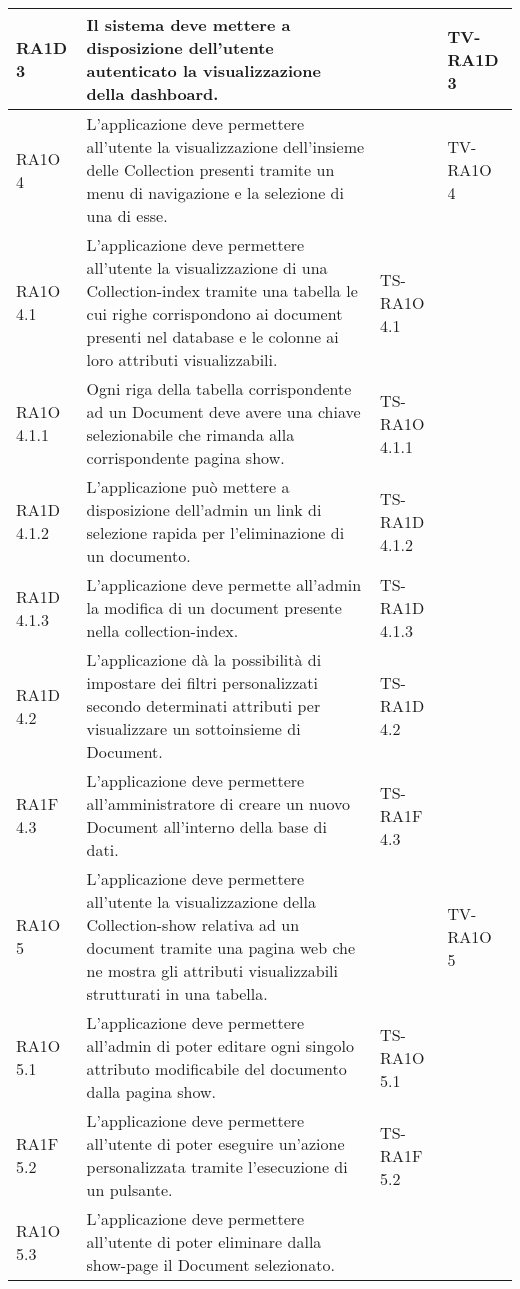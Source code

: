 \begin{center}
\begin{longtable}{| p{2cm} | p{6cm} | p{2.5cm} | p{2.5cm} | }
				RA1D 3 & 
				Il sistema deve mettere a disposizione dell'utente autenticato la visualizzazione della dashboard. &  & TV-RA1D 3 \\ \hline 
				RA1O 4 & 
				L'applicazione deve permettere all'utente la visualizzazione dell'insieme delle Collection presenti tramite un menu di navigazione e la selezione di una di esse. &  & TV-RA1O 4 \\ \hline 
				RA1O 4.1 & 
				L'applicazione deve permettere all'utente la visualizzazione di una Collection-index tramite una tabella le cui righe corrispondono ai document presenti nel database e le colonne ai loro attributi visualizzabili. & TS-RA1O 4.1 & \\ \hline 
				RA1O 4.1.1 & 
				Ogni riga della tabella corrispondente ad un Document deve avere una chiave selezionabile che rimanda alla corrispondente pagina show. & TS-RA1O 4.1.1 & \\ \hline 
				RA1D 4.1.2 & 
				L’applicazione può mettere a disposizione dell’admin un link di selezione rapida per l’eliminazione di un documento. & TS-RA1D 4.1.2 & \\ \hline 
				RA1D 4.1.3 & 
				L’applicazione deve permette all’admin la modifica di un document presente nella collection-index. & TS-RA1D 4.1.3 & \\ \hline 
				RA1D 4.2 & 
				L’applicazione dà la possibilità di impostare dei filtri personalizzati secondo determinati attributi per visualizzare un sottoinsieme di Document. & TS-RA1D 4.2 & \\ \hline 
				RA1F 4.3 & 
				L’applicazione deve permettere all’amministratore di creare un nuovo Document all’interno della base di dati. & TS-RA1F 4.3 & \\ \hline 
				RA1O 5 & 
				L'applicazione deve permettere all'utente la visualizzazione della Collection-show relativa ad un document tramite una pagina web che ne mostra gli attributi visualizzabili strutturati in una tabella. &  & TV-RA1O 5 \\ \hline 
				RA1O 5.1 & 
				L'applicazione deve permettere all'admin di poter editare ogni singolo attributo modificabile del documento dalla pagina show. & TS-RA1O 5.1 & \\ \hline 
				RA1F 5.2 & 
				L’applicazione deve permettere all’utente di poter eseguire un’azione personalizzata tramite l’esecuzione di un pulsante. & TS-RA1F 5.2 & \\ \hline 
				RA1O 5.3 & 
				L'applicazione deve permettere all'utente di poter eliminare dalla show-page il Document selezionato.

\end{longtable}
\end{center}
